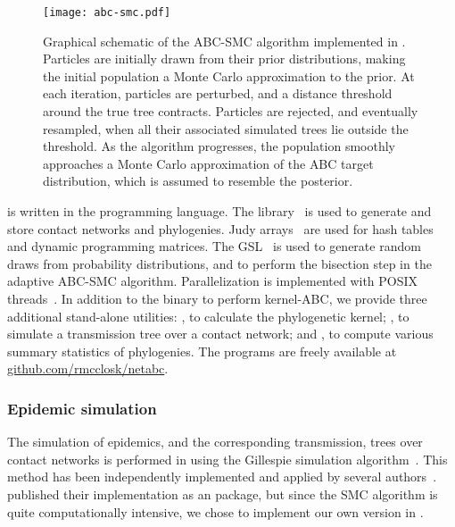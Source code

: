 \begin{figure}
    \texttt{[image: abc-smc.pdf]}
    \caption[Graphical schematic of \gls{ABC}-\gls{SMC} algorithm.]{
      Graphical schematic of the \gls{ABC}-\gls{SMC} algorithm implemented in
      . Particles are initially drawn from their prior
      distributions, making the initial population a Monte Carlo approximation
      to the prior. At each iteration, particles are perturbed, and a distance
      threshold around the true tree contracts. Particles are rejected, and
      eventually resampled, when all their associated simulated trees lie
      outside the threshold. As the algorithm progresses, the population
      smoothly approaches a Monte Carlo approximation of the \gls{ABC} target
      distribution, which is assumed to resemble the posterior.
    }
    \label{fig:abcsmc}
\end{figure}

 is written in the  programming language. The
 library~\autocite{csardi2006igraph} is used to generate and
store contact networks and phylogenies. Judy arrays~\autocite{baskins2004judy}
are used for hash tables and dynamic programming matrices. The
\gls{GSL}~\autocite{gough2009gnu} is used to generate random draws from
probability distributions, and to perform the bisection step in the adaptive
\gls{ABC}-\gls{SMC} algorithm. Parallelization is implemented with POSIX
threads~\autocite{barney2009posix}. In addition to the  binary
to perform kernel-\gls{ABC}, we provide three additional stand-alone utilities:
, to calculate the phylogenetic kernel;
, to simulate a transmission tree over a contact network; and
, to compute various summary statistics of phylogenies. The
programs are freely available at \url{github.com/rmcclosk/netabc}.

\subsubsection*{Epidemic simulation}
\label{subsubsec:nettree}

The simulation of epidemics, and the corresponding transmission, trees over
contact networks is performed in  using the Gillespie
simulation algorithm~\autocite{gillespie1976general}. This method has been
independently implemented and applied by several
authors~\autocite[\textit{e.g.}][]{o2010contact, robinson2013dynamics,
leventhal2012inferring, groendyke2011bayesian, villandre2016assessment}.
\textcite{groendyke2011bayesian} published their implementation as an
 package, but since the \gls{SMC} algorithm is quite
computationally intensive, we chose to implement our own version in
.

